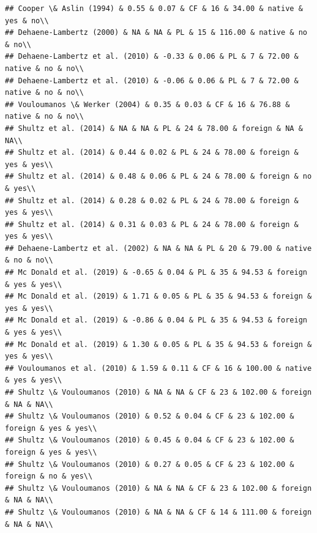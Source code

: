 \documentclass[man]{apa6}
\begin{document}
\begin{verbatim}
## Cooper \& Aslin (1994) & 0.55 & 0.07 & CF & 16 & 34.00 & native & yes & no\\
## Dehaene-Lambertz (2000) & NA & NA & PL & 15 & 116.00 & native & no & no\\
## Dehaene-Lambertz et al. (2010) & -0.33 & 0.06 & PL & 7 & 72.00 & native & no & no\\
## Dehaene-Lambertz et al. (2010) & -0.06 & 0.06 & PL & 7 & 72.00 & native & no & no\\
## Vouloumanos \& Werker (2004) & 0.35 & 0.03 & CF & 16 & 76.88 & native & no & no\\
## Shultz et al. (2014) & NA & NA & PL & 24 & 78.00 & foreign & NA & NA\\
## Shultz et al. (2014) & 0.44 & 0.02 & PL & 24 & 78.00 & foreign & yes & yes\\
## Shultz et al. (2014) & 0.48 & 0.06 & PL & 24 & 78.00 & foreign & no & yes\\
## Shultz et al. (2014) & 0.28 & 0.02 & PL & 24 & 78.00 & foreign & yes & yes\\
## Shultz et al. (2014) & 0.31 & 0.03 & PL & 24 & 78.00 & foreign & yes & yes\\
## Dehaene-Lambertz et al. (2002) & NA & NA & PL & 20 & 79.00 & native & no & no\\
## Mc Donald et al. (2019) & -0.65 & 0.04 & PL & 35 & 94.53 & foreign & yes & yes\\
## Mc Donald et al. (2019) & 1.71 & 0.05 & PL & 35 & 94.53 & foreign & yes & yes\\
## Mc Donald et al. (2019) & -0.86 & 0.04 & PL & 35 & 94.53 & foreign & yes & yes\\
## Mc Donald et al. (2019) & 1.30 & 0.05 & PL & 35 & 94.53 & foreign & yes & yes\\
## Vouloumanos et al. (2010) & 1.59 & 0.11 & CF & 16 & 100.00 & native & yes & yes\\
## Shultz \& Vouloumanos (2010) & NA & NA & CF & 23 & 102.00 & foreign & NA & NA\\
## Shultz \& Vouloumanos (2010) & 0.52 & 0.04 & CF & 23 & 102.00 & foreign & yes & yes\\
## Shultz \& Vouloumanos (2010) & 0.45 & 0.04 & CF & 23 & 102.00 & foreign & yes & yes\\
## Shultz \& Vouloumanos (2010) & 0.27 & 0.05 & CF & 23 & 102.00 & foreign & no & yes\\
## Shultz \& Vouloumanos (2010) & NA & NA & CF & 23 & 102.00 & foreign & NA & NA\\
## Shultz \& Vouloumanos (2010) & NA & NA & CF & 14 & 111.00 & foreign & NA & NA\\

\end{verbatim}
\end{document}
